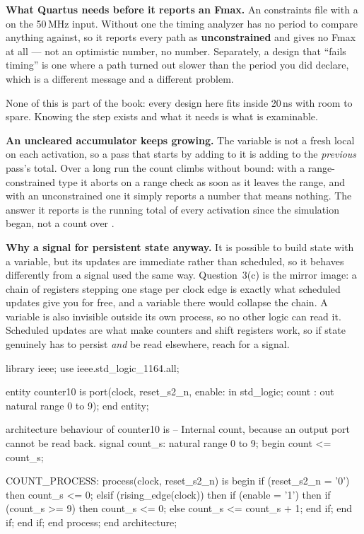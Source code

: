\textbf{What Quartus needs before it reports an Fmax.} An  constraints file with a
 on the 50\,MHz input. Without one the timing analyzer has no period to compare
anything against, so it reports every path as \textbf{unconstrained} and gives no Fmax at all ---
not an optimistic number, no number. Separately, a design that ``fails timing'' is one where a path
turned out slower than the period you did declare, which is a different message and a different
problem.

None of this is part of the book: every design here fits inside 20\,ns with room to spare. Knowing
the step exists and what it needs is what is examinable. 

\textbf{An uncleared accumulator keeps growing.} The variable is not a fresh local on each
activation, so a pass that starts by adding to it is adding to the \emph{previous} pass's total.
Over a long run the count climbs without bound: with a range-constrained type it aborts on a range
check as soon as it leaves the range, and with an unconstrained one it simply reports a number that
means nothing. The answer it reports is the running total of every activation since the simulation
began, not a count over . 

\textbf{Why a signal for persistent state anyway.} It is possible to build state with a variable,
but its updates are immediate rather than scheduled, so it behaves differently from a signal used
the same way. Question~3(c) is the mirror image: a chain of registers stepping one stage per clock
edge is exactly what scheduled updates give you for free, and a variable there would collapse the
chain. A variable is also invisible outside its own process, so no other logic can read it.
Scheduled updates are what make counters and shift registers work, so if state genuinely has to
persist \emph{and} be read elsewhere, reach for a signal. 


\begin{vhdlcode}
library ieee;
use ieee.std_logic_1164.all;

entity counter10 is
    port(clock, reset_s2_n, enable: in  std_logic;
         count                    : out natural range 0 to 9);
end entity;

architecture behaviour of counter10 is
-- Internal count, because an output port cannot be read back.
signal count_s: natural range 0 to 9;
begin
    count <= count_s;

    COUNT_PROCESS: process(clock, reset_s2_n) is
    begin
        if (reset_s2_n = '0') then
            count_s <= 0;
        elsif (rising_edge(clock)) then
            if (enable = '1') then
                if (count_s >= 9) then
                    count_s <= 0;
                else
                    count_s <= count_s + 1;
                end if;
            end if;
        end if;
    end process;
end architecture;
\end{vhdlcode}


